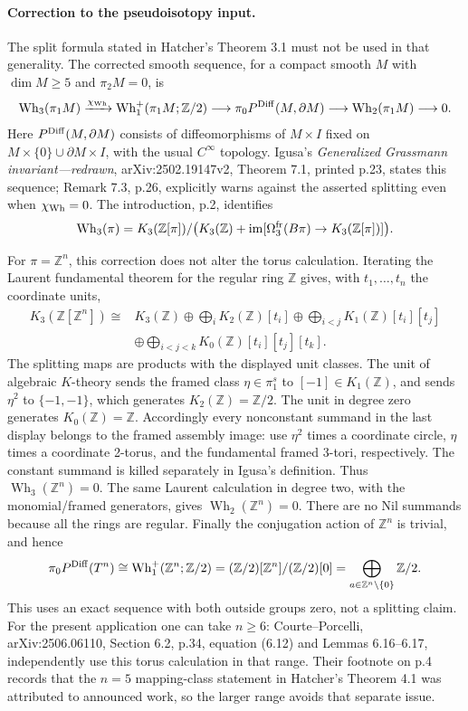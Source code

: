 \paragraph{Correction to the pseudoisotopy input.}
The split formula stated in Hatcher's Theorem 3.1 must not be used
in that generality.  The corrected smooth sequence, for a compact
smooth $M$ with $\dim M\geq5$ and $\pi_2M=0$, is
\[
 \operatorname{Wh}_3(\pi_1M)
 \xrightarrow{\chi_{\rm Wh}}
 \operatorname{Wh}_1^+(\pi_1M;\mathbb Z/2)
 \longrightarrow\pi_0P^{\rm Diff}(M,\partial M)
 \longrightarrow\operatorname{Wh}_2(\pi_1M)
 \longrightarrow0.
\]
Here $P^{\rm Diff}(M,\partial M)$ consists of diffeomorphisms of
$M\times I$ fixed on $M\times\{0\}\cup\partial M\times I$,
with the usual $C^\infty$ topology.  Igusa's \emph{Generalized
Grassmann invariant---redrawn}, arXiv:2502.19147v2,
Theorem 7.1, printed p.23, states this sequence; Remark 7.3, p.26,
explicitly warns against the asserted splitting even when
$\chi_{\rm Wh}=0$.  The introduction, p.2, identifies
\[
 \operatorname{Wh}_3(\pi)=
 K_3(\mathbb Z[\pi])/
 \bigl(K_3(\mathbb Z)+\operatorname{im}
             [\Omega^{\rm fr}_3(B\pi)\to K_3(\mathbb Z[\pi])]\bigr).
\]

For $\pi=\mathbb Z^n$, this correction does not alter the torus
calculation.  Iterating the Laurent fundamental theorem for the
regular ring $\mathbb Z$ gives, with $t_1,\dots,t_n$ the coordinate
units,
\[
\begin{split}
 K_3(\mathbb Z[\mathbb Z^n])\cong {}&K_3(\mathbb Z)
 \oplus\bigoplus_i K_2(\mathbb Z)[t_i]
 \oplus\bigoplus_{i<j} K_1(\mathbb Z)[t_i][t_j]\\
 &\oplus\bigoplus_{i<j<k}K_0(\mathbb Z)[t_i][t_j][t_k].
\end{split}
\]
The splitting maps are products with the displayed unit classes.
The unit of algebraic $K$-theory sends the framed class
$\eta\in\pi^s_1$ to $[-1]\in K_1(\mathbb Z)$, and sends
$\eta^2$ to $\{-1,-1\}$, which generates
$K_2(\mathbb Z)=\mathbb Z/2$.  The unit in degree zero generates
$K_0(\mathbb Z)=\mathbb Z$.  Accordingly every nonconstant summand
in the last display belongs to the framed assembly image:
use $\eta^2$ times a coordinate circle, $\eta$ times a coordinate
2-torus, and the fundamental framed 3-tori, respectively.  The
constant summand is killed separately in Igusa's definition.
Thus $\operatorname{Wh}_3(\mathbb Z^n)=0$.  The same Laurent
calculation in degree two, with the monomial/framed generators,
gives $\operatorname{Wh}_2(\mathbb Z^n)=0$.  There are no Nil
summands because all the rings are regular.  Finally the conjugation
action of $\mathbb Z^n$ is trivial, and hence
\[
 \pi_0P^{\rm Diff}(T^n)
 \cong\operatorname{Wh}_1^+(\mathbb Z^n;\mathbb Z/2)
 = (\mathbb Z/2)[\mathbb Z^n]/(\mathbb Z/2)[0]
 =\bigoplus_{a\in\mathbb Z^n\setminus\{0\}}\mathbb Z/2.
\]
This uses an exact sequence with both outside groups zero, not a
splitting claim.  For the present application one can take $n\geq6$:
Courte--Porcelli, arXiv:2506.06110, Section 6.2, p.34,
equation (6.12) and Lemmas 6.16--6.17, independently use this torus
calculation in that range.  Their footnote on p.4 records that the
$n=5$ mapping-class statement in Hatcher's Theorem 4.1 was attributed
to announced work, so the larger range avoids that separate issue.

